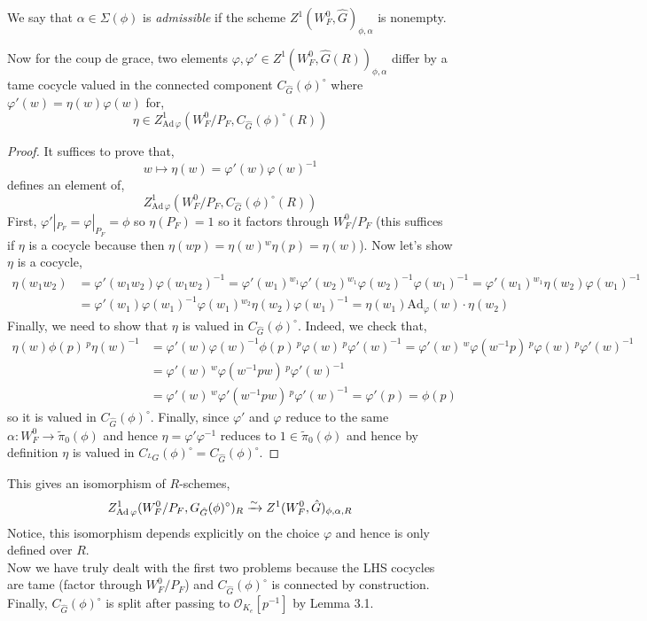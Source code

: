 \documentclass[12pt]{article}
\renewcommand{\Ad}{\mathrm{Ad}}
\newcommand{\LG}{{}^L G}
\newcommand{\ok}{\mathcal{O}_{K_e}}
\begin{document}
\begin{defn}
We say that $\alpha \in \Sigma(\phi)$ is \textit{admissible} if the scheme $Z^1(W_F^0, \hat{G})_{\phi, \alpha}$ is nonempty.
\end{defn}

Now for the coup de grace, two elements $\varphi, \varphi' \in Z^1(W_F^0, \hat{G}(R))_{\phi, \alpha}$ differ by a tame cocycle valued in the connected component $C_{\hat{G}}(\phi)^\circ$ where $\varphi'(w) = \eta(w) \varphi(w)$ for,
\[ \eta \in Z^1_{\Ad \, \varphi}(W_F^0/P_F, C_{\hat{G}}(\phi)^\circ(R)) \]

\begin{proof}
It suffices to prove that,
\[ w \mapsto \eta(w) = \varphi'(w) \varphi(w)^{-1} \]
defines an element of,
\[ Z^1_{\Ad \, \varphi}(W_F^0/P_F, C_{\hat{G}}(\phi)^\circ(R)) \]
First, $\varphi' |_{P_F} = \varphi|_{P_F} = \phi$ so $\eta(P_F) = 1$ so it factors through $W_F^0 / P_F$ (this suffices if $\eta$ is a cocycle because then $\eta(wp) = \eta(w) {}^w \eta(p) = \eta(w)$). Now let's show $\eta$ is a cocycle,
\begin{align*}
\eta(w_1 w_2) & = \varphi'(w_1 w_2) \varphi(w_1 w_2)^{-1} = \varphi'(w_1) {}^{w_1} \varphi'(w_2) {}^{w_1} \varphi(w_2)^{-1} \varphi(w_1)^{-1} = \varphi'(w_1) {}^{w_1}\eta(w_2) \varphi(w_1)^{-1}
\\
& = \varphi'(w_1) \varphi(w_1)^{-1} \varphi(w_1) {}^{w_2} \eta(w_2) \varphi(w_1)^{-1} = \eta(w_1) \Ad_{\varphi}(w) \cdot \eta(w_2) 
\end{align*}
Finally, we need to show that $\eta$ is valued in $C_{\hat{G}}(\phi)^\circ$. Indeed, we check that,
\begin{align*}
\eta(w) \phi(p) \, {}^p \eta(w)^{-1} & = \varphi'(w) \varphi(w)^{-1} \phi(p) \, {}^p \varphi(w)  \,{}^p \varphi'(w)^{-1} = \varphi'(w) \, {}^w \varphi(w^{-1} p) \, {}^p \varphi(w) \, {}^p \varphi'(w)^{-1}
\\
& = \varphi'(w) \, {}^w \varphi(w^{-1} p w) \, {}^p \varphi'(w)^{-1}
\\
& = \varphi'(w) \, {}^w \varphi'(w^{-1} p w) \, {}^p \varphi'(w)^{-1} = \varphi'(p) = \phi(p)
\end{align*}
so it is valued in $C_{\hat{G}}(\phi)^\circ$. Finally, since $\varphi'$ and $\varphi$ reduce to the same $\alpha : W_F^0 \to \tilde{\pi}_0(\phi)$ and hence $\eta = \varphi' \varphi^{-1}$ reduces to $1 \in \tilde{\pi}_0(\phi)$ and hence by definition $\eta$ is valued in $C_{\LG}(\phi)^\circ = C_{\hat{G}}(\phi)^\circ$. 
\end{proof}

This gives an isomorphism of $R$-schemes,
\[ Z^1_{\Ad \, \varphi}(W_F^0 / P_F, G_{\hat{G}}(\phi)^\circ)_R \iso Z^1(W^0_F, \hat{G})_{\phi, \alpha, R} \]
Notice, this isomorphism depends explicitly on the choice $\varphi$ and hence is only defined over $R$. 
\bigskip\\
Now we have truly dealt with the first two problems because the LHS cocycles are tame (factor through $W_F^0 / P_F$) and $C_{\hat{G}}(\phi)^\circ$ is connected by construction. Finally, $C_{\hat{G}}(\phi)^\circ$ is split after passing to $\ok[p^{-1}]$ by Lemma 3.1. 
\end{document}
